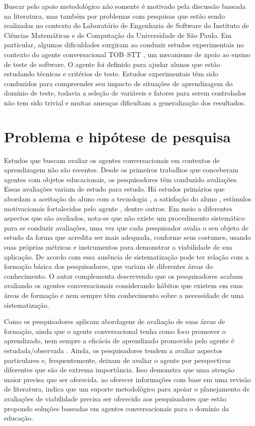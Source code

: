 Buscar pelo apoio metodológico não somente é motivado pela discussão baseada na literatura, mas também por problemas com pesquisas que estão sendo realizadas no contexto do Laboratório de Engenharia de Software do Instituto de Ciências Matemáticas e de Computação da Universidade de São Paulo. Em particular, algumas dificuldades surgiram ao conduzir estudos experimentais no contexto do agente conversacional TOB--STT \cite{Paschoal:2019}, um mecanismo de apoio ao ensino de teste de software. O agente foi definido para ajudar alunos que estão estudando técnicas e critérios de teste. Estudos experimentais têm sido conduzidos para compreender seu impacto de situações de aprendizagem do domínio de teste, todavia a seleção de variáveis e fatores para serem controlados não tem sido trivial e muitas ameaças dificultam a generalização dos resultados. 

\section{Problema e hipótese de pesquisa}


Estudos que buscam avaliar os agentes conversacionais em contextos de aprendizagem não são recentes. Desde os primeiros trabalhos que conceberam agentes com objetos educacionais, os pesquisadores têm conduzido avaliações. Essas avaliações variam de estudo para estudo. Há estudos primários que abordam a aceitação do aluno com a tecnologia \cite{liu2019cbet, 9081419}, a satisfação do aluno \cite{krassmann2018}, estímulos motivacionais fortalecidos pelo agente \cite{FRYER2019279}, dentre outros. Em meio a diferentes aspectos que são avaliados, nota-se que não existe um procedimento sistemático para se conduzir avaliações, uma vez que cada pesquisador avalia o seu objeto de estudo da forma que acredita ser mais adequada, conforme seus costumes, usando suas próprias métricas e instrumentos para demonstrar a viabilidade de sua aplicação. De acordo com  essa ausência de sistematização pode ter relação com a formação básica dos pesquisadores, que variam de diferentes áreas do conhecimento. O autor complementa descrevendo que os pesquisadores acabam avaliando os agentes conversacionais considerando hábitos que existem em suas áreas de formação e nem sempre têm conhecimento sobre a necessidade de uma sistematização.

Como os pesquisadores aplicam abordagens de avaliação de suas áreas de formação, ainda que o agente conversacional tenha como foco promover o aprendizado, nem sempre a eficácia de aprendizado promovido pelo agente é estudada/observada \cite{hobert2019}. Ainda, os pesquisadores tendem a avaliar aspectos particulares e, frequentemente, deixam de avaliar o agente por perspectivas diferentes que são de extrema importância. Isso demonstra que uma atenção maior precisa que ser oferecida.  ao oferecer informações com base em uma revisão de literatura, indica que um suporte metodológico para apoiar o planejamento de avaliações de viabilidade precisa ser oferecido aos pesquisadores que estão propondo soluções baseadas em agentes conversacionais para o domínio da educação. 

